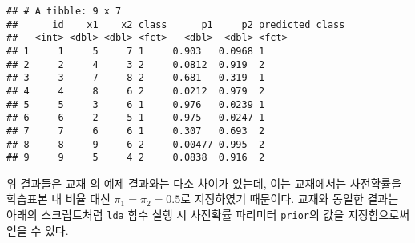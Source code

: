 \documentclass[]{book}
\newenvironment{Shaded}{\begin{snugshade}}{\end{snugshade}}
\newcommand{\DataTypeTok}[1]{\textcolor[rgb]{0.13,0.29,0.53}{#1}}
\newcommand{\KeywordTok}[1]{\textcolor[rgb]{0.13,0.29,0.53}{\textbf{#1}}}
\newcommand{\NormalTok}[1]{#1}
\newcommand{\OperatorTok}[1]{\textcolor[rgb]{0.81,0.36,0.00}{\textbf{#1}}}
\newcommand{\StringTok}[1]{\textcolor[rgb]{0.31,0.60,0.02}{#1}}
\begin{document}
\begin{Shaded}
\end{Shaded}

\begin{verbatim}
## # A tibble: 9 x 7
##      id    x1    x2 class      p1     p2 predicted_class
##   <int> <dbl> <dbl> <fct>   <dbl>  <dbl> <fct>          
## 1     1     5     7 1     0.903   0.0968 1              
## 2     2     4     3 2     0.0812  0.919  2              
## 3     3     7     8 2     0.681   0.319  1              
## 4     4     8     6 2     0.0212  0.979  2              
## 5     5     3     6 1     0.976   0.0239 1              
## 6     6     2     5 1     0.975   0.0247 1              
## 7     7     6     6 1     0.307   0.693  2              
## 8     8     9     6 2     0.00477 0.995  2              
## 9     9     5     4 2     0.0838  0.916  2
\end{verbatim}

위 결과들은 교재 \citep{jun2012datamining}의 예제 결과와는 다소 차이가 있는데, 이는 교재에서는 사전확률을 학습표본 내 비율 대신 \(\pi_1 = \pi_2 = 0.5\)로 지정하였기 때문이다. 교재와 동일한 결과는 아래의 스크립트처럼 \texttt{lda} 함수 실행 시 사전확률 파리미터 \texttt{prior}의 값을 지정함으로써 얻을 수 있다.
\end{document}

